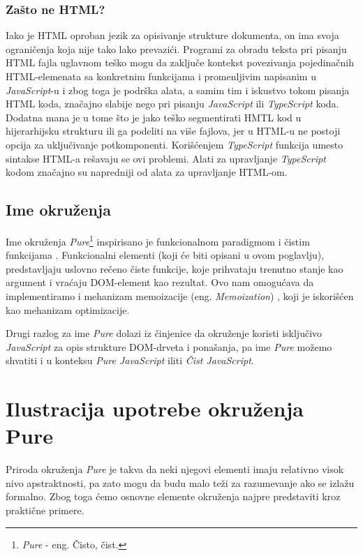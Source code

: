 \documentclass[12pt,oneside]{memoir}
\begin{document}
\subsection{Zašto ne HTML?} \label{subsec:zasto-ne-html}
Iako je HTML oproban jezik za opisivanje strukture dokumenta, on ima svoja ograničenja koja nije tako lako prevazići.
Programi za obradu teksta pri pisanju HTML fajla uglavnom teško mogu da zaključe kontekst povezivanja
pojedinačnih HTML-elemenata sa konkretnim funkcijama i promenljivim napisanim u \emph{JavaScript}-u i zbog toga je podrška alata,
a samim tim i iskustvo tokom pisanja HTML koda, značajno slabije nego pri pisanju \emph{JavaScript} ili \emph{TypeScript} koda.
Dodatna mana je u tome što je jako teško segmentirati HMTL kod u hijerarhijsku strukturu ili ga podeliti na više fajlova,
jer u HTML-u ne postoji opcija za uključivanje potkomponenti.
Korišćenjem \emph{TypeScript} funkcija umesto sintakse HTML-a rešavaju se ovi problemi.
Alati za upravljanje \emph{TypeScript} kodom značajno su napredniji od alata za upravljanje HTML-om.

\section{Ime okruženja}
Ime okruženja \emph{Pure}\footnote{\emph{Pure} - eng. Čisto, čist.} inspirisano je 
funkcionalnom paradigmom i čistim funkcijama \cite{functionalProgramming}. Funkcionalni elementi (koji će biti opisani u ovom poglavlju),
predstavljaju uslovno rečeno čiste funkcije, koje prihvataju trenutno stanje kao argument i vraćaju
DOM-element kao rezultat. Ovo nam omogućava da implementiramo i mehanizam memoizacije (eng. \emph{Memoization}) \cite{functionalProgramming},
koji je iskorišćen kao mehanizam optimizacije.

Drugi razlog za ime \emph{Pure} dolazi iz činjenice da okruženje koristi isključivo \emph{JavaScript}
za opis strukture DOM-drveta i ponašanja, pa ime \emph{Pure} možemo shvatiti i u konteksu \emph{Pure JavaScript} iliti \emph{Čist JavaScript}.

\chapter{Ilustracija upotrebe okruženja Pure}\label{chap:pure-okruzenje}
Priroda okruženja \emph{Pure} je takva da neki njegovi elementi imaju relativno visok nivo apstraktnosti,
pa zato mogu da budu malo teži za razumevanje ako se izlažu formalno.
Zbog toga ćemo osnovne elemente okruženja najpre predstaviti kroz praktične primere.
\end{document}
